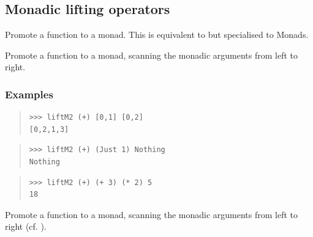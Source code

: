 \subsection{Monadic lifting operators}
\begin{haddockdesc}
\item[\begin{tabular}{@{}l}
liftM :: Monad m => (a1 -> r) -> m a1 -> m r
\end{tabular}]
{\haddockbegindoc
Promote a function to a monad.
 This is equivalent to  but specialised to Monads.\par}
\end{haddockdesc}
\begin{haddockdesc}
\item[\begin{tabular}{@{}l}
liftM2 :: Monad m => (a1 -> a2 -> r) -> m a1 -> m a2 -> m r
\end{tabular}]
{\haddockbegindoc
Promote a function to a monad, scanning the monadic arguments from
 left to right.\par
\subsubsection*{\textbf{Examples}}
\begin{quote}
{\haddockverb\begin{verbatim}
>>> liftM2 (+) [0,1] [0,2]
[0,2,1,3]

\end{verbatim}}
\end{quote}
\begin{quote}
{\haddockverb\begin{verbatim}
>>> liftM2 (+) (Just 1) Nothing
Nothing

\end{verbatim}}
\end{quote}
\begin{quote}
{\haddockverb\begin{verbatim}
>>> liftM2 (+) (+ 3) (* 2) 5
18

\end{verbatim}}
\end{quote}}
\end{haddockdesc}
\begin{haddockdesc}
\item[\begin{tabular}{@{}l}
liftM3 :: Monad m => (a1 -> a2 -> a3 -> r) -> m a1 -> m a2 -> m a3 -> m r
\end{tabular}]
{\haddockbegindoc
Promote a function to a monad, scanning the monadic arguments from
 left to right (cf. ).\par}
\end{haddockdesc}
